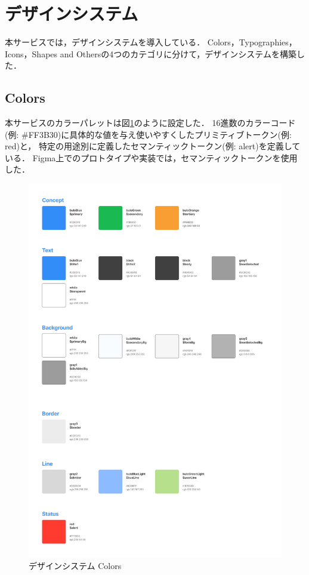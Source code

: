 \section{デザインシステム}
本サービスでは，デザインシステムを導入している．
Colors，Typographies，Icons，Shapes and Othersの4つのカテゴリに分けて，デザインシステムを構築した．
\subsection{Colors}
本サービスのカラーパレットは図\ref{fig:feature_colors}のように設定した．
16進数のカラーコード(例: \#FF3B30)に具体的な値を与え使いやすくしたプリミティブトークン(例: red)と，
特定の用途別に定義したセマンティックトークン(例: alert)を定義している．
Figma上でのプロトタイプや実装では，セマンティックトークンを使用した．
\begin{figure}[H]
    \centering
    \includegraphics[width=12cm]{images/colors.png}
    \caption{デザインシステム Colors}
    \label{fig:feature_colors}
\end{figure}
